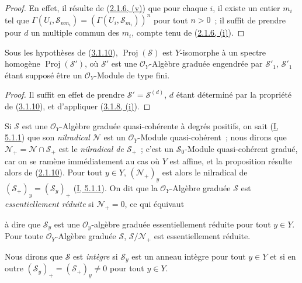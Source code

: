 \begin{proof}
En effet, il résulte de (\hyperref[II.2.1.6-fr]{2.1.6, (v)}) que pour chaque
$i$, il existe un entier $m_i$ tel que
$\Gamma(U_i,\mathcal{S}_{nm_i})=(\Gamma(U_i,\mathcal{S}_{m_i}))^n$ pour tout
$n>0$~; il suffit de prendre pour $d$ un multiple commun des $m_i$, compte
tenu de (\hyperref[II.2.1.6-fr]{2.1.6, (i)}).
\end{proof}

\begin{corollary}[3.1.11]
\label{II.3.1.11-fr}
Sous les hypothèses de (\hyperref[II.3.1.10-fr]{3.1.10}),
$\operatorname{Proj}(\mathcal{S})$ est $Y$-isomorphe à un spectre homogène
$\operatorname{Proj}(\mathcal{S}')$, où $\mathcal{S}'$ est une
$\mathcal{O}_Y$-Algèbre graduée engendrée par $\mathcal{S}'_1$,
$\mathcal{S}'_1$ étant supposé être un $\mathcal{O}_Y$-Module de type fini.
\end{corollary}

\begin{proof}
Il suffit en effet de prendre $\mathcal{S}'=\mathcal{S}^{(d)}$, $d$ étant
déterminé par la propriété de (\hyperref[II.3.1.10-fr]{3.1.10}), et
d'appliquer (\hyperref[II.3.1.8-fr]{3.1.8, (i)}).
\end{proof}

\begin{env}[3.1.12]
\label{II.3.1.12-fr}
Si $\mathcal{S}$ est une $\mathcal{O}_Y$-Algèbre graduée quasi-cohérente à
degrés positifs, on sait (\hyperref[I.5.1.1-fr]{I, 5.1.1}) que son
\emph{nilradical} $\mathcal{N}$ est un $\mathcal{O}_Y$-Module
quasi-cohérent~; nous dirons que $\mathcal{N}_+=\mathcal{N}\cap\mathcal{S}_+$
est le \emph{nilradical de $\mathcal{S}_+$}~; c'est un
$\mathcal{S}_0$-Module quasi-cohérent gradué, car on se ramène immédiatement
au cas où $Y$ est affine, et la proposition résulte alors de
(\hyperref[II.2.1.10-fr]{2.1.10}). Pour tout $y\in Y$,
$(\mathcal{N}_+)_y$ est alors le nilradical de
$(\mathcal{S}_+)_y=(\mathcal{S}_y)_+$
(\hyperref[I.5.1.1-fr]{I, 5.1.1}). On dit que la
$\mathcal{O}_Y$-Algèbre graduée $\mathcal{S}$ est \emph{essentiellement
réduite} si $\mathcal{N}_+=0$, ce qui équivaut


à dire que $\mathcal{S}_y$
est une $\mathcal{O}_y$-algèbre graduée essentiellement réduite pour tout
$y\in Y$. Pour toute $\mathcal{O}_Y$-Algèbre graduée $\mathcal{S}$,
$\mathcal{S}/\mathcal{N}_+$ est essentiellement réduite.

Nous dirons que $\mathcal{S}$ est \emph{intègre} si $\mathcal{S}_y$ est un
anneau intègre pour tout $y\in Y$ et si en outre
$(\mathcal{S}_y)_+=(\mathcal{S}_+)_y\neq0$ pour tout $y\in Y$.
\end{env}

